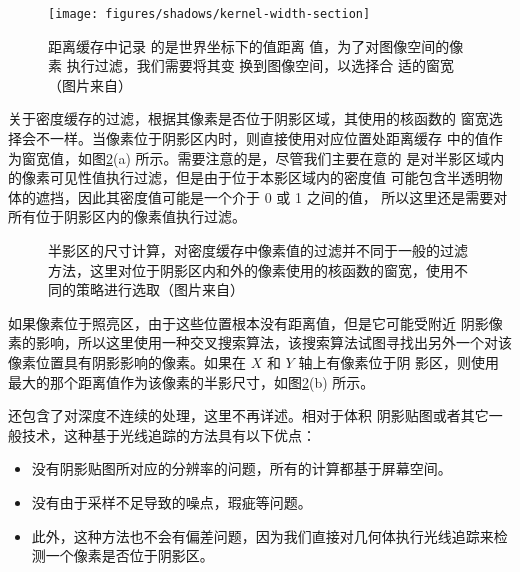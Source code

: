 \begin{figure}
\sidecaption
	\texttt{[image: figures/shadows/kernel-width-section]}
	\caption{距离缓存中记录 的是世界坐标下的值距离 值，为了对图像空间的像素 执行过滤，我们需要将其变 换到图像空间，以选择合 适的窗宽（图片来自\cite{a:Implementingfastraytracedsoftshadowsinagameengine}）}
	\label{f:df-kernel-width-section}
\end{figure}

关于密度缓存的过滤，根据其像素是否位于阴影区域，其使用的核函数的 窗宽选择会不一样。当像素位于阴影区内时，则直接使用对应位置处距离缓存 中的值作为窗宽值，如图\ref{f:df-ray-tracing-buffers}(a) 所示。需要注意的是，尽管我们主要在意的 是对半影区域内的像素可见性值执行过滤，但是由于位于本影区域内的密度值 可能包含半透明物体的遮挡，因此其密度值可能是一个介于 0 或 1 之间的值， 所以这里还是需要对所有位于阴影区内的像素值执行过滤。

\begin{figure}
\caption{半影区的尺寸计算，对密度缓存中像素值的过滤并不同于一般的过滤方法，这里对位于阴影区内和外的像素使用的核函数的窗宽，使用不同的策略进行选取（图片来自\cite{a:Implementingfastraytracedsoftshadowsinagameengine}）}
\label{f:df-ray-tracing-buffers} %
\end{figure}

如果像素位于照亮区，由于这些位置根本没有距离值，但是它可能受附近 阴影像素的影响，所以这里使用一种交叉搜索算法，该搜索算法试图寻找出另外一个对该像素位置具有阴影影响的像素。如果在 $X$ 和 $Y$ 轴上有像素位于阴 影区，则使用最大的那个距离值作为该像素的半影尺寸，如图\ref{f:df-ray-tracing-buffers}(b) 所示。

\cite{a:Implementingfastraytracedsoftshadowsinagameengine}还包含了对深度不连续的处理，这里不再详述。相对于体积 阴影贴图或者其它一般技术，这种基于光线追踪的方法具有以下优点：

\begin{itemize}
	\item 没有阴影贴图所对应的分辨率的问题，所有的计算都基于屏幕空间。
	\item 没有由于采样不足导致的噪点，瑕疵等问题。
	\item 此外，这种方法也不会有偏差问题，因为我们直接对几何体执行光线追踪来检测一个像素是否位于阴影区。
\end{itemize}



